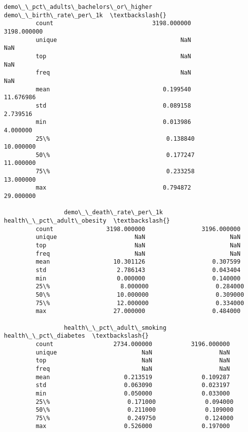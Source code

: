 \documentclass[11pt]{article}
\begin{document}
\begin{Verbatim}[commandchars=\\\{\}]
                 demo\_\_pct\_adults\_bachelors\_or\_higher  demo\_\_birth\_rate\_per\_1k  \textbackslash{}
         count                            3198.000000              3198.000000   
         unique                                   NaN                      NaN   
         top                                      NaN                      NaN   
         freq                                     NaN                      NaN   
         mean                                0.199540                11.676986   
         std                                 0.089158                 2.739516   
         min                                 0.013986                 4.000000   
         25\%                                 0.138840                10.000000   
         50\%                                 0.177247                11.000000   
         75\%                                 0.233258                13.000000   
         max                                 0.794872                29.000000   
         
                 demo\_\_death\_rate\_per\_1k  health\_\_pct\_adult\_obesity  \textbackslash{}
         count               3198.000000                3196.000000   
         unique                      NaN                        NaN   
         top                         NaN                        NaN   
         freq                        NaN                        NaN   
         mean                  10.301126                   0.307599   
         std                    2.786143                   0.043404   
         min                    0.000000                   0.140000   
         25\%                    8.000000                   0.284000   
         50\%                   10.000000                   0.309000   
         75\%                   12.000000                   0.334000   
         max                   27.000000                   0.484000   
         
                 health\_\_pct\_adult\_smoking  health\_\_pct\_diabetes  \textbackslash{}
         count                 2734.000000           3196.000000   
         unique                        NaN                   NaN   
         top                           NaN                   NaN   
         freq                          NaN                   NaN   
         mean                     0.213519              0.109287   
         std                      0.063090              0.023197   
         min                      0.050000              0.033000   
         25\%                      0.171000              0.094000   
         50\%                      0.211000              0.109000   
         75\%                      0.249750              0.124000   
         max                      0.526000              0.197000   
         

\end{Verbatim}
\end{document}
